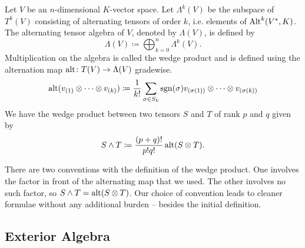 \documentclass[a4paper,12pt]{article}
\begin{document}
\begin{definition}\label{def:alternating_tensor_algebra}
    Let $V$ be an $n$-dimensional $K$-vector space.
    Let $\Lambda^k(V)$ be the subspace of $T^k(V)$ consisting of alternating tensors of order $k$, i.e. elements of $\operatorname{Alt}^k(V^*, K)$.
    The alternating tensor algebra of $V$, denoted by $\Lambda(V)$, is defined by
    \begin{equation}
        \Lambda(V) \coloneq \bigoplus_{k=0}^n \Lambda^k(V).
    \end{equation}
    Multiplication on the algebra is called the wedge product and is defined using the alternation map $\operatorname{alt} \colon T(V) \to \Lambda(V)$ gradewise.
    \begin{equation}
        \operatorname{alt}(v_{(1)} \otimes \cdots \otimes v_{(k)}) \coloneq \frac{1}{k!} \sum_{\sigma \in S_k} \operatorname{sgn}(\sigma) v_{(\sigma(1))} \otimes \cdots \otimes v_{(\sigma(k))}
    \end{equation}
    We have the wedge product between two tensors $S$ and $T$ of rank $p$ and $q$ given by
    \begin{equation}
        S \wedge T \coloneq \frac{(p+q)!}{p!q!} \operatorname{alt}(S \otimes T).
    \end{equation}
\end{definition}
\begin{remark}
    There are two conventions with the definition of the wedge product.
    One involves the factor in front of the alternating map that we used.
    The other involves no such factor, so $S \wedge T = \operatorname{alt}(S \otimes T)$.
    Our choice of convention leads to cleaner formulae without any additional burden -- besides the initial definition.
\end{remark}

\subsection{Exterior Algebra}\label{subsec:multilinear_algebra:exterior_algebra}
\end{document}
